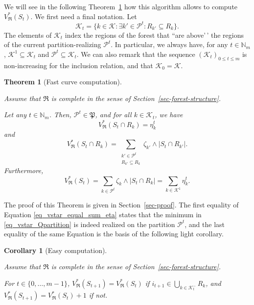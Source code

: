 \documentclass[
  11pt,
  a4paper,
]{article}
\theoremstyle{definition}
\theoremstyle{plain}
\newtheorem{corollary}{Corollary}[section]
\theoremstyle{plain}
\newtheorem{theorem}{Theorem}[section]
\theoremstyle{plain}
\theoremstyle{definition}
\theoremstyle{remark}
\begin{document}
We will see in the following Theorem~\ref{thm-curve-path} how this
algorithm allows to compute \(V^*_{\mathfrak{R}}(S_t)\). We first need a
final notation. Let \begin{equation*}
\mathcal{K}_t=\{k\in\mathcal{K}: \exists k'\in \mathcal{P}^t : R_{k'}\subseteq R_k   \}.
\end{equation*} The elements of \(\mathcal{K}_t\) index the regions of
the forest that ``are above'\,' the regions of the current
partition-realizing \(\mathcal{P}^t\). In particular, we always have,
for any \(t\in\mathbb{N}_m\), \(\mathcal{K}^1\subseteq\mathcal{K}_t\)
and \(\mathcal{P}^t\subseteq \mathcal{K}_t\). We can also remark that
the sequence \((\mathcal{K}_t)_{0\leq t \leq m}\) is non-increasing for
the inclusion relation, and that \(\mathcal{K}_0=\mathcal{K}\).

\begin{theorem}[Fast curve
computation]\protect\hypertarget{thm-curve-path}{}\label{thm-curve-path}

Assume that \(\mathfrak{R}\) is complete in the sense of
Section~\ref{sec-forest-structure}.

Let any \(t\in\mathbb{N}_m\). Then, \(\mathcal{P}^t\in\mathfrak P\), and
for all \(k\in\mathcal{K}_t\), we have \begin{equation}
V^*_{\mathfrak{R}}(S_t\cap R_k) = \eta_k^t
\label{eq_vstar_inter_Rk_equal_eta}
\end{equation} and \begin{equation}
V^*_{\mathfrak{R}}(S_t\cap R_k) = \sum_{\substack{k'\in \mathcal{P}^t\\ R_{k'}\subseteq R_k}} \zeta_{k'}\wedge|S_t \cap R_{k'}|.
\label{eq_Pt_good_partition}
\end{equation} Furthermore, \begin{equation}
V^*_{\mathfrak{R}}(S_t)  = \sum_{{k\in \mathcal{P}^t}} \zeta_{k}\wedge|S_t \cap R_{k}|= \sum_{k\in\mathcal{K}^1} \eta_k^t.
\label{eq_vstar_equal_sum_eta}
\end{equation}

\end{theorem}

The proof of this Theorem is given in Section~\ref{sec-proof}. The first
equality of Equation \eqref{eq_vstar_equal_sum_eta} states that the
minimum in \eqref{eq_vstar_Qpartition} is indeed realized on the
partition \(\mathcal{P}^t\), and the last equality of the same Equation
is the basis of the following light corollary.

\begin{corollary}[Easy
computation]\protect\hypertarget{cor-easy-impl}{}\label{cor-easy-impl}

Assume that \(\mathfrak{R}\) is complete in the sense of
Section~\ref{sec-forest-structure}.

For \(t\in\{0,\dotsc, m-1 \}\),
\(V^*_{\mathfrak{R}}(S_{t+1})=V^*_{\mathfrak{R}}(S_{t})\) if
\(i_{t+1}\in \bigcup_{k\in\mathcal{K}^-_t}R_k\), and
\(V^*_{\mathfrak{R}}(S_{t+1})=V^*_{\mathfrak{R}}(S_{t}) + 1\) if not.

\end{corollary}
\end{document}
